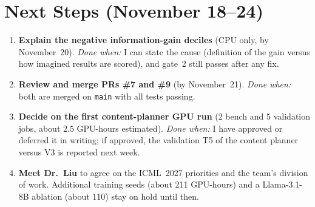\documentclass[11pt,letterpaper]{article}
\begin{document}
\section{Next Steps (November 18--24)}
\begin{enumerate}
  \item \textbf{Explain the negative information-gain deciles} (CPU only, by November~20). \emph{Done when:} I can state the cause (definition of the gain versus how imagined results are scored), and gate~2 still passes after any fix.
  \item \textbf{Review and merge PRs \#7 and \#9} (by November~21). \emph{Done when:} both are merged on \texttt{main} with all tests passing.
  \item \textbf{Decide on the first content-planner GPU run} (2 bench and 5 validation jobs, about 2.5 GPU-hours estimated). \emph{Done when:} I have approved or deferred it in writing; if approved, the validation T5 of the content planner versus V3 is reported next week.
  \item \textbf{Meet Dr.~Liu} to agree on the ICML~2027 priorities and the team's division of work. Additional training seeds (about 211 GPU-hours) and a Llama-3.1-8B ablation (about 110) stay on hold until then.
\end{enumerate}
\end{document}
